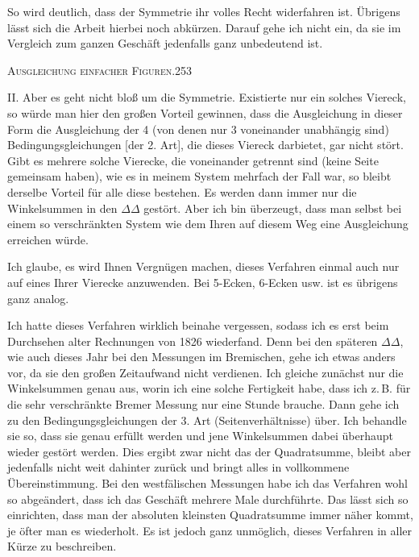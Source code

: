 So wird deutlich, dass der Symmetrie ihr volles Recht widerfahren ist. Übrigens lässt sich die Arbeit hierbei noch abkürzen. Darauf gehe ich nicht ein, da sie im Vergleich zum ganzen Geschäft jedenfalls ganz unbedeutend ist.

\clearpage
\noindent\mbox{}\hfill\textsc{Ausgleichung einfacher Figuren.}\hfill253\par\medskip
II. Aber es geht nicht bloß um die Symmetrie. Existierte nur ein solches Viereck, so würde man hier den großen Vorteil gewinnen, dass die Ausgleichung in dieser Form die Ausgleichung der 4 (von denen nur 3 voneinander unabhängig sind) Bedingungsgleichungen [der 2. Art], die dieses Viereck darbietet, gar nicht stört. Gibt es mehrere solche Vierecke, die voneinander getrennt sind (keine Seite gemeinsam haben), wie es in meinem System mehrfach der Fall war, so bleibt derselbe Vorteil für alle diese bestehen. Es werden dann immer nur die Winkelsummen in den  $\Delta\Delta$ gestört. Aber ich bin überzeugt, dass man selbst bei einem so verschränkten System wie dem Ihren auf diesem Weg eine  Ausgleichung erreichen würde.

Ich glaube, es wird Ihnen Vergnügen machen, dieses Verfahren einmal auch nur auf eines Ihrer Vierecke anzuwenden. Bei 5-Ecken, 6-Ecken usw. ist es übrigens ganz analog.

Ich hatte dieses Verfahren wirklich beinahe vergessen, sodass ich es erst beim Durchsehen alter Rechnungen von 1826 wiederfand. Denn bei den späteren $\Delta\Delta$, wie auch dieses Jahr bei den Messungen im Bremischen, gehe ich etwas anders vor, da sie den großen Zeitaufwand nicht verdienen. Ich gleiche zunächst nur die Winkelsummen genau aus, worin ich eine solche Fertigkeit habe, dass ich z.\,B. für die sehr verschränkte Bremer Messung nur eine Stunde brauche. Dann gehe ich zu den Bedingungsgleichungen der 3. Art (Seitenverhältnisse) über. Ich behandle sie so, dass sie genau erfüllt werden und jene Winkelsummen dabei überhaupt  wieder gestört werden. Dies ergibt zwar nicht das  der Quadratsumme, bleibt aber jedenfalls nicht weit dahinter zurück und bringt alles in vollkommene Übereinstimmung. Bei den westfälischen Messungen habe ich das Verfahren wohl so abgeändert, dass ich das Geschäft mehrere Male durchführte. Das lässt sich so einrichten, dass man der absoluten kleinsten Quadratsumme immer näher kommt, je öfter man es wiederholt. Es ist jedoch ganz unmöglich, dieses Verfahren in aller Kürze zu beschreiben.


